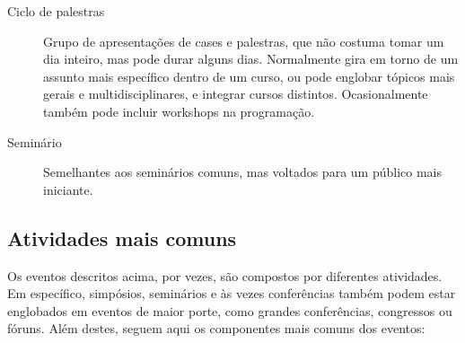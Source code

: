 \documentclass[12pt,a4paper,twoside,hyphens,english,brazil]{abntex2}
\begin{document}
\begin{description}
	\item[Ciclo de palestras] Grupo de apresentações de cases e palestras, que não costuma tomar um dia inteiro, mas pode durar alguns dias. Normalmente gira em torno de um assunto mais específico dentro de um curso, ou pode englobar tópicos mais gerais e multidisciplinares, e integrar cursos distintos. Ocasionalmente também pode incluir workshops na programação.
		
	\item[Seminário] Semelhantes aos seminários comuns, mas voltados para um público mais iniciante.
\end{description}

\subsection{Atividades mais comuns}
Os eventos descritos acima, por vezes, são compostos por diferentes atividades. Em específico, simpósios, seminários e às vezes conferências também podem estar englobados em eventos de maior porte, como grandes conferências, congressos ou fóruns. Além destes, seguem aqui os componentes mais comuns dos eventos:
\end{document}
